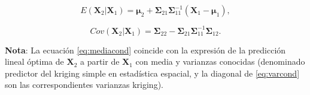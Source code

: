 \documentclass[
]{book}
\theoremstyle{break}
\theoremstyle{nonumberplain}
\begin{document}
\begin{equation}
E \left( \mathbf{X}_2 | \mathbf{X}_1 \right) = \boldsymbol\mu_2 + \boldsymbol\Sigma_{21} \boldsymbol\Sigma_{11}^{-1}
\left(  \mathbf{X}_1 - \boldsymbol\mu_1 \right), 
\label{eq:mediacond}
\end{equation}

\begin{equation}
Cov \left( \mathbf{X}_2 | \mathbf{X}_1 \right) =
\boldsymbol\Sigma_{22} - \boldsymbol\Sigma_{21} \boldsymbol\Sigma_{11}^{-1} \boldsymbol\Sigma_{12}.
\label{eq:varcond}
\end{equation}

\textbf{Nota}: La ecuación \eqref{eq:mediacond} coincide con la expresión de la predicción lineal óptima de \(\mathbf{X}_2\)
a partir de \(\mathbf{X}_1\) con media y varianzas conocidas (denominado predictor del kriging simple en estadística espacial, y la diagonal de \eqref{eq:varcond} son las correspondientes varianzas kriging).
\end{document}
